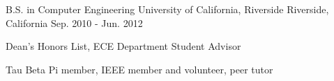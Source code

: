 

\begin{cventries}

  \cventry
    {B.S. in Computer Engineering} %
    {University of California, Riverside} %
    {Riverside, California} %
    {Sep. 2010 - Jun. 2012} %
    {} %
    {
      \begin{cvitems} %
        \item {Dean's Honors List, ECE Department Student Advisor}
        \item {Tau Beta Pi member, IEEE member and volunteer, peer tutor}
      \end{cvitems}
    }
\end{cventries}
